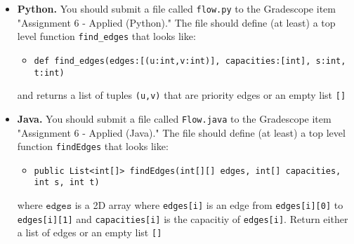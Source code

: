 \documentclass[11pt]{article}
\begin{document}
\begin{itemize}
	\item \textbf{Python.} You should submit a file called \texttt{flow.py} to the Gradescope item "Assignment 6 - Applied (Python)." The file should define (at least) a top level function \texttt{find\_edges} that looks like: 
\begin{itemize}
\item \verb|def find_edges(edges:[(u:int,v:int)], capacities:[int], s:int, t:int)|
\end{itemize}

	and returns a list of tuples \verb|(u,v)| that are priority edges or an empty list \verb|[]|
	
    \item \textbf{Java.} You should submit a file called \texttt{Flow.java} to the Gradescope item "Assignment 6 - Applied (Java)." The file should define (at least) a top level function \texttt{findEdges} that looks like: 
    \begin{itemize}
        \item \verb|public List<int[]> findEdges(int[][] edges, int[] capacities, int s, int t)|
    \end{itemize}
    where $\texttt{edges}$ is a 2D array where \texttt{edges[i]} is an edge from \texttt{edges[i][0]} to \texttt{edges[i][1]} and \texttt{capacities[i]} is the capacitiy of \texttt{edges[i]}. Return either a list of edges or an empty list \verb|[]|
\end{itemize}
\end{document}
